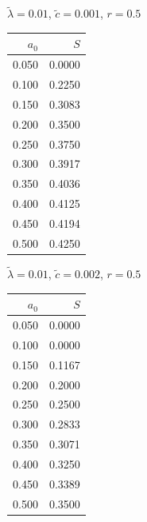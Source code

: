 \documentclass[11pt,a4paper,dvipsnames,twosided]{article}
\begin{document}
\begin{minipage}[t]{\textwidth}
    \begin{minipage}[t]{0.32\textwidth}
        \footnotesize
        \begin{flushleft}$\tilde{\lambda}=0.01$, $\tilde{c}=0.001$, $r=0.5$\end{flushleft}
        \begin{tabular}[t]{rr}
            $a_0$ & $S$ \\
            \hline
             0.050 & 0.0000 \\
             0.100 & 0.2250 \\
             0.150 & 0.3083 \\
             0.200 & 0.3500 \\
             0.250 & 0.3750 \\
             0.300 & 0.3917 \\
             0.350 & 0.4036 \\
             0.400 & 0.4125 \\
             0.450 & 0.4194 \\
             0.500 & 0.4250 \\
        \end{tabular}
    \end{minipage}
    \begin{minipage}[t]{0.32\textwidth}
        \footnotesize
        \begin{flushleft}$\tilde{\lambda}=0.01$, $\tilde{c}=0.002$, $r=0.5$\end{flushleft}
        \begin{tabular}[t]{rr}
            $a_0$ & $S$ \\
            \hline
             0.050 & 0.0000 \\
             0.100 & 0.0000 \\
             0.150 & 0.1167 \\
             0.200 & 0.2000 \\
             0.250 & 0.2500 \\
             0.300 & 0.2833 \\
             0.350 & 0.3071 \\
             0.400 & 0.3250 \\
             0.450 & 0.3389 \\
             0.500 & 0.3500 \\
        \end{tabular}
    \end{minipage}
    \begin{minipage}[t]{0.32\textwidth}

\end{minipage}
\end{minipage}
\end{document}
